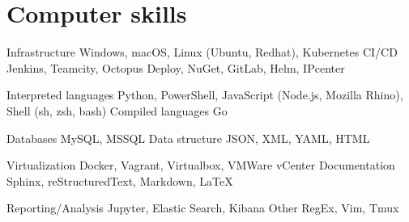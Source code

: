 \section{Computer skills}

\cvcomputer %
  {Infrastructure}
    {Windows, macOS, Linux (Ubuntu, Redhat), Kubernetes}
  {CI/CD}
    {Jenkins, Teamcity, Octopus Deploy, NuGet, GitLab, Helm, IPcenter}

\cvcomputer %
  {Interpreted languages}
    {Python, PowerShell, JavaScript (Node.js, Mozilla Rhino), Shell (sh, zsh, bash)}
  {Compiled languages}
    {Go}

\cvcomputer %
  {Databases}
    {MySQL, MSSQL}
  {Data structure}
    {JSON, XML, YAML, HTML}

\cvcomputer %
  {Virtualization}
    {Docker, Vagrant, Virtualbox, VMWare vCenter}
  {Documentation}
    {Sphinx, reStructuredText, Markdown, LaTeX}

\cvcomputer %
  {Reporting/Analysis}
    {Jupyter, Elastic Search, Kibana}
  {Other}
    {RegEx, Vim, Tmux}

\closesection{}
